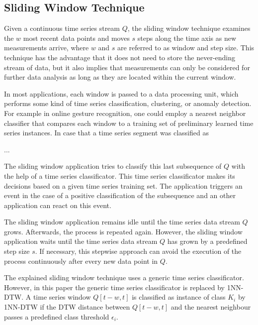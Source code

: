 \subsection{Sliding Window Technique} \label{sliding_window_technique}

Given a continuous time series stream $Q$, the sliding window technique examines the $w$ most recent data points and moves $s$ steps along the time axis as new measurements arrive, where $w$ and $s$ are referred to as window and step size. This technique has the advantage that it does not need to store the never-ending stream of data, but it also implies that measurements can only be considered for further data analysis as long as they are located within the current window. 

In most applications, each window is passed to a data processing unit, which performs some kind of time series classification, clustering, or anomaly detection. For example in online gesture recognition, one could employ a nearest neighbor classifier that compares each window to a training set of preliminary learned time series instances. In case that a time series segment was classified as   

...

The sliding window application tries to classify this last subsequence of $Q$ with the
help of a time series classificator. This time series classificator makes its decisions based on a given time series
training set. The application triggers an event in the case of a positive classification of the subsequence and an other
application can react on this event.

The sliding window application remains idle until the time series data stream $Q$
grows. Afterwards, the process is repeated again. However, the sliding window application waits until the time series
data stream $Q$ has grown by a predefined step size $s$. If necessary, this stepwise approach can avoid the execution of
the process continuously after every new data point in $Q$.

The explained sliding window technique uses a generic time series classificator. However, in this paper the
generic time series classificator is replaced by 1NN-DTW. A time series window $Q[t-w,t]$ is classified as instance of
class $K_i$ by 1NN-DTW if the DTW distance between $Q[t-w,t]$ and the nearest neighbour passes a predefined
class threshold $\epsilon_i$.
